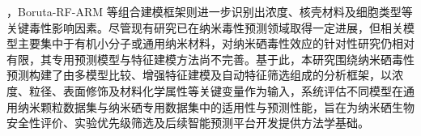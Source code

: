  
 
，Boruta-RF-ARM 等组合建模框架则进一步识别出浓度、核壳材料及细胞类型等关键毒性影响因素\cite{yildirim2025rheumatoid}。尽管现有研究已在纳米毒性预测领域取得一定进展，但相关模型主要集中于有机小分子或通用纳米材料，对纳米硒毒性效应的针对性研究仍相对有限，其专用预测模型与特征建模方法尚不完善。基于此，本研究围绕纳米硒毒性预测构建了由多模型比较、增强特征建模及自动特征筛选组成的分析框架，以浓度、粒径、表面修饰及材料化学属性等关键变量作为输入，系统评估不同模型在通用纳米颗粒数据集与纳米硒专用数据集中的适用性与预测性能，旨在为纳米硒生物安全性评价、实验优先级筛选及后续智能预测平台开发提供方法学基础。
